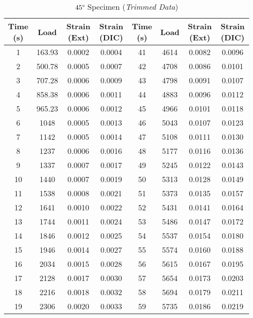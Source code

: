 \begin{table}[!h]
    \centering
    \caption{$45\degree$ Specimen (\textit{Trimmed Data})}
    \begin{tabular}{|c||c|c|c||c||c|c|c|}\toprule
        \textbf{Time (s)} & \textbf{Load} & \textbf{Strain (Ext)} & \textbf{Strain (DIC)} & \textbf{Time (s)} & \textbf{Load} & \textbf{Strain (Ext)} & \textbf{Strain (DIC)}\\\midrule
        1  & 163.93 & 0.0002 & 0.0004 & 41 & 4614 & 0.0082 & 0.0096 \\\hline
        2  & 500.78 & 0.0005 & 0.0007 & 42 & 4708 & 0.0086 & 0.0101 \\\hline
        3  & 707.28 & 0.0006 & 0.0009 & 43 & 4798 & 0.0091 & 0.0107 \\\hline
        4  & 858.38 & 0.0006 & 0.0011 & 44 & 4883 & 0.0096 & 0.0112 \\\hline
        5  & 965.23 & 0.0006 & 0.0012 & 45 & 4966 & 0.0101 & 0.0118 \\\hline
        6  & 1048 & 0.0005 & 0.0013 & 46 & 5043 & 0.0107 & 0.0123 \\\hline
        7  & 1142 & 0.0005 & 0.0014 & 47 & 5108 & 0.0111 & 0.0130 \\\hline
        8  & 1237 & 0.0006 & 0.0016 & 48 & 5177 & 0.0116 & 0.0136 \\\hline
        9  & 1337 & 0.0007 & 0.0017 & 49 & 5245 & 0.0122 & 0.0143 \\\hline
        10 & 1440 & 0.0007 & 0.0019 & 50 & 5313 & 0.0128 & 0.0149 \\\hline
        11 & 1538 & 0.0008 & 0.0021 & 51 & 5373 & 0.0135 & 0.0157 \\\hline
        12 & 1641 & 0.0010 & 0.0022 & 52 & 5431 & 0.0141 & 0.0164 \\\hline
        13 & 1744 & 0.0011 & 0.0024 & 53 & 5486 & 0.0147 & 0.0172 \\\hline
        14 & 1846 & 0.0012 & 0.0025 & 54 & 5537 & 0.0154 & 0.0180 \\\hline
        15 & 1946 & 0.0014 & 0.0027 & 55 & 5574 & 0.0160 & 0.0188 \\\hline
        16 & 2034 & 0.0015 & 0.0028 & 56 & 5615 & 0.0167 & 0.0195 \\\hline 
        17 & 2128 & 0.0017 & 0.0030 & 57 & 5654 & 0.0173 & 0.0203 \\\hline 
        18 & 2216 & 0.0018 & 0.0032 & 58 & 5694 & 0.0179 & 0.0211 \\\hline 
        19 & 2306 & 0.0020 & 0.0033 & 59 & 5735 & 0.0186 & 0.0219 \\\hline 

\end{tabular}
\end{table}
